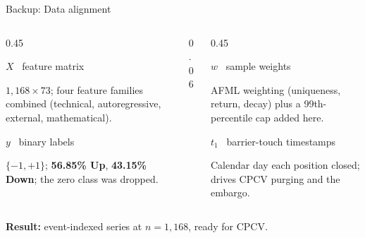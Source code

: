 \documentclass[aspectratio=169, t]{beamer}
\begin{document}
\begin{frame}{Backup: Data alignment}
\vspace{-1.0em}

\begin{columns}[T]
\begin{column}{0.45\textwidth}
{
\begin{block}{$X$ \textemdash\ feature matrix}
\footnotesize
\begin{minipage}[t][1.4cm][t]{\linewidth}
$1{,}168 \times 73$; four feature families combined (technical, autoregressive, external, mathematical).
\end{minipage}
\end{block}
}
\vspace{0.4em}
{
\begin{block}{$y$ \textemdash\ binary labels}
\footnotesize
\begin{minipage}[t][1.4cm][t]{\linewidth}
$\{-1,+1\}$; \textbf{56.85\% Up}, \textbf{43.15\% Down}; the zero class was dropped.
\end{minipage}
\end{block}
}
\end{column}
\begin{column}{0.06\textwidth}\hfill\end{column}
\begin{column}{0.45\textwidth}
{
\begin{block}{$w$ \textemdash\ sample weights}
\footnotesize
\begin{minipage}[t][1.4cm][t]{\linewidth}
AFML weighting (uniqueness, return, decay) plus a 99th-percentile cap added here.
\end{minipage}
\end{block}
}
\vspace{0.4em}
{
\begin{block}{$t_1$ \textemdash\ barrier-touch timestamps}
\footnotesize
\begin{minipage}[t][1.4cm][t]{\linewidth}
Calendar day each position closed; drives CPCV purging and the embargo.
\end{minipage}
\end{block}
}
\end{column}
\end{columns}

\vspace{1.5em}
\centering
{\footnotesize \textbf{Result:} event-indexed series at $n = 1{,}168$, ready for CPCV.}
\end{frame}
\end{document}
